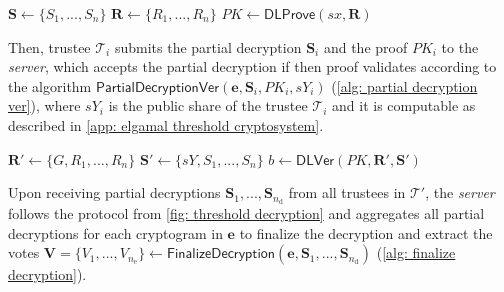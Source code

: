 \begin{algorithm}[!h]
\DontPrintSemicolon
    \caption{$\mathsf{PartiallyDecryptAndProve}(\boldsymbol{e}, sx)$}
    
    $\boldsymbol{S} \gets \{S_1, ..., S_n\}$ \;
    $\boldsymbol{R} \gets \{R_1, ..., R_n\}$ \;
    $PK \gets \mathsf{DLProve}(sx, \boldsymbol{R})$ 
    
     
    
    \label{alg: partially decrypt and prove}
\end{algorithm}

Then, trustee $\mathcal{T}_i$ submits the partial decryption $\boldsymbol{S}_i$ and the proof $PK_i$ to the \textit{server}, which accepts the partial decryption if then proof validates according to the algorithm $\mathsf{PartialDecryptionVer}(\boldsymbol{e}, \boldsymbol{S}_i, PK_i, sY_i)$ (\cref{alg: partial decryption ver}), where $sY_i$ is the public share of the trustee $\mathcal{T}_i$ and it is computable as described in \cref{app: elgamal threshold cryptosystem}.

\begin{algorithm}[H]
\DontPrintSemicolon
    \caption{$\mathsf{PartialDecryptionVer}(\boldsymbol{e}, \boldsymbol{S}, PK, sY)$}
    
    $\boldsymbol{R}' \gets \{G, R_1, ..., R_n\}$ \;
    $\boldsymbol{S}' \gets \{sY, S_1, ..., S_n\}$ \;
    $b \gets \mathsf{DLVer}(PK, \boldsymbol{R}', \boldsymbol{S}')$ 
    
     
    
    \label{alg: partial decryption ver}
\end{algorithm}

Upon receiving partial decryptions $\boldsymbol{S}_1, ..., \boldsymbol{S}_{n_\mathrm{d}}$ from all trustees in $\boldsymbol{\mathcal{T}'}$, the \textit{server} follows the protocol from \cref{fig: threshold decryption} and aggregates all partial decryptions for each cryptogram in $\boldsymbol{e}$ to finalize the decryption and extract the votes $\boldsymbol{V} = \{ V_1, ..., V_{n_\mathrm{e}} \} \gets \mathsf{FinalizeDecryption} (\boldsymbol{e}, \boldsymbol{S}_1, ..., \boldsymbol{S}_{n_\mathrm{d}})$ (\cref{alg: finalize decryption}).

